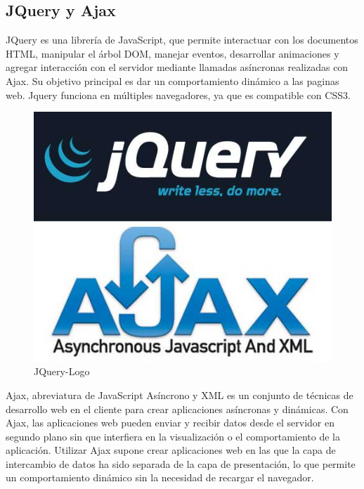 \documentclass[a4paper,11pt]{book}
\begin{document}
 

\subsection{JQuery y Ajax}

JQuery\cite{jq} es una librería de JavaScript, que permite interactuar con los documentos HTML, manipular el árbol DOM, manejar eventos, desarrollar animaciones y agregar interacción con el servidor mediante llamadas asíncronas realizadas con Ajax. Su objetivo principal es dar un comportamiento dinámico a las paginas web. Jquery funciona en múltiples navegadores, ya que es compatible con CSS3.

\begin{figure}[H] 
\centering 
\includegraphics[scale=0.25]{imagenes/desarrollo_herramienta/ajax_jq.jpg}
\caption{ JQuery-Logo\cite{jq2}  }  
\end{figure}   

Ajax\cite{aj}, abreviatura de JavaScript Asíncrono y XML es un conjunto de técnicas de desarrollo web en el cliente para crear aplicaciones asíncronas y dinámicas. Con Ajax, las aplicaciones web pueden enviar y recibir datos desde el servidor en segundo plano sin que interfiera en la visualización o el comportamiento de la aplicación. Utilizar Ajax supone crear aplicaciones web en las que la capa de intercambio de datos ha sido separada de la capa de presentación, lo que permite un comportamiento dinámico sin la necesidad de recargar el navegador. 
\end{document}
